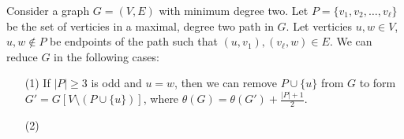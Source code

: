 \documentclass[../techreport.tex]{subfiles}
\begin{document}
\begin{reduction} 
	Consider a graph $G = (V, E)$ with minimum degree two. Let $P = \{v_1, v_2, \dots, v_{\ell}\}$ be the set of verticies in a maximal, degree two path in $G$. Let verticies $u, w \in V$, $u, w \notin P$ be endpoints of the path such that $(u, v_1), (v_{\ell}, w) \in E$. We can reduce $G$ in the following cases:

	\begin{itemize}
		\item[(1)] If $|P| \geq 3$ is odd and $u = w$, then we can remove $P \cup \{u\}$ from $G$ to form $G' = G[V \setminus (P \cup \{u\})]$, where $\theta(G) = \theta(G') + \frac{|P|+1}{2}$.

		\item[(2)]

	\end{itemize}
\end{reduction}
\end{document}
